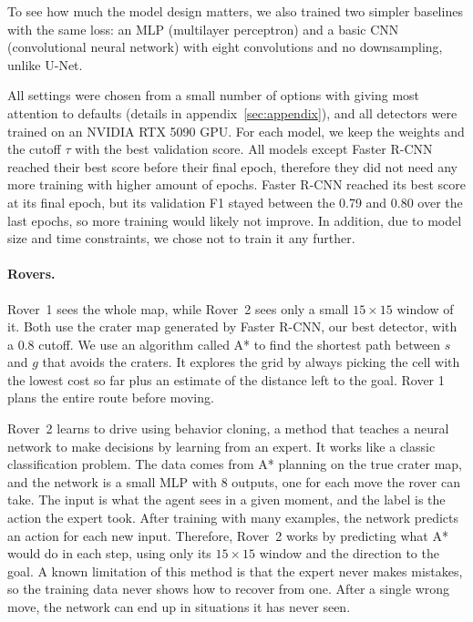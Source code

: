 \documentclass{article} %
\begin{document}
To see how much the model design matters, we also trained two simpler baselines with the same loss: an MLP (multilayer perceptron) and a basic CNN (convolutional neural network) with eight convolutions and no downsampling, unlike U-Net.

All settings were chosen from a small number of options with giving most attention to defaults (details in appendix~\ref{sec:appendix}), and all detectors were trained on an NVIDIA RTX 5090 GPU. For each model, we keep the weights and the cutoff $\tau$ with the best validation score. All models except Faster R-CNN reached their best score before their final epoch, therefore they did not need any more training with higher amount of epochs. Faster R-CNN reached its best score at its final epoch, but its validation F1 stayed between the 0.79 and 0.80 over the last epochs, so more training would likely not improve. In addition, due to model size and time constraints, we chose not to train it any further.

\paragraph{Rovers.}
Rover~1 sees the whole map, while Rover~2 sees only a small $15 \times 15$ window of it. Both use the crater map generated by Faster R-CNN, our best detector, with a 0.8 cutoff. We use an algorithm called A* \cite{hart1968} to find the shortest path between $s$ and $g$ that avoids the craters. It explores the grid by always picking the cell with the lowest cost so far plus an estimate of the distance left to the goal. Rover 1 plans the entire route before moving.

Rover~2 learns to drive using behavior cloning, a method that teaches a neural network to make decisions by learning from an expert. It works like a classic classification problem. The data comes from A* planning on the true crater map, and the network is a small MLP with 8 outputs, one for each move the rover can take. The input is what the agent sees in a given moment, and the label is the action the expert took. After training with many examples, the network predicts an action for each new input. Therefore, Rover~2 works by predicting what A* would do in each step, using only its $15 \times 15$ window and the direction to the goal. A known limitation of this method is that the expert never makes mistakes, so the training data never shows how to recover from one. After a single wrong move, the network can end up in situations it has never seen.
\end{document}
